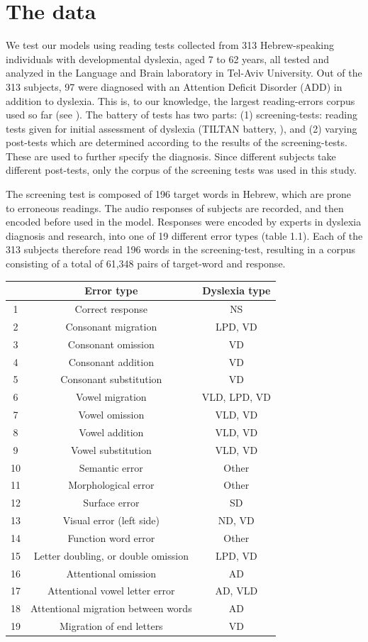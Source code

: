 {\section{The data}
We test our models using reading tests collected from 313 Hebrew-speaking individuals with developmental dyslexia, aged 7 to 62 years, all tested and analyzed in the Language and Brain laboratory in Tel-Aviv University. Out of the 313 subjects, 97 were diagnosed with an Attention Deficit Disorder (ADD) in addition to dyslexia. This is, to our knowledge, the largest reading-errors corpus used so far (see \citealp{p07, rbl14}). The battery of tests has two parts: (1) screening-tests: reading tests given for initial assessment of dyslexia (TILTAN battery, \citealp{fg03}), and (2) varying post-tests which are determined according to the results of the screening-tests. These are used to further specify the diagnosis. Since different subjects take different post-tests, only the corpus of the screening tests was used in this study.

The screening test is composed of 196 target words in Hebrew, which are prone to erroneous readings. The audio responses of subjects are recorded, and then encoded before used in the model. Responses were encoded by experts in dyslexia diagnosis and research, into one of 19 different error types (table 1.1). Each of the 313 subjects therefore read 196 words in the screening-test, resulting in a corpus consisting of a total of 61,348 pairs of target-word and response.

\begin{table}

\centering
\begin{tabular}{|c|c|c|} \hline

& Error type & Dyslexia type\\
\hline
1 & Correct response & NS\\
2 & Consonant migration & LPD, VD\\
3 & Consonant omission & VD\\
4 & Consonant addition & VD\\
5 & Consonant substitution & VD\\
6 & Vowel migration & VLD, LPD, VD\\
7 & Vowel omission & VLD, VD\\
8 & Vowel addition & VLD, VD\\
9 & Vowel substitution & VLD, VD\\
10 & Semantic error & Other\\
11 & Morphological error & Other\\
12 & Surface error & SD\\
13 & Visual error (left side) & ND, VD\\
14 & Function word error & Other\\
15 & Letter doubling, or double omission & LPD, VD\\
16 & Attentional omission & AD\\
17 & Attentional vowel letter error & AD, VLD\\
18 & Attentional migration between words & AD\\
19 & Migration of end letters & VD\\


\end{tabular}
\end{table}}
